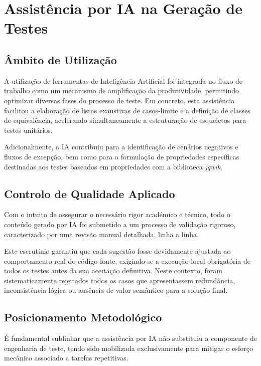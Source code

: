 \documentclass{article}
\begin{document}
\section{Assistência por IA na Geração de Testes}

\subsection{Âmbito de Utilização}

A utilização de ferramentas de Inteligência Artificial foi integrada no fluxo de trabalho como um mecanismo de amplificação da produtividade, permitindo optimizar diversas fases do processo de teste. Em concreto, esta assistência facilitou a elaboração de listas exaustivas de casos-limite e a definição de classes de equivalência, acelerando simultaneamente a estruturação de esqueletos para testes unitários. 

Adicionalmente, a IA contribuiu para a identificação de cenários negativos e fluxos de excepção, bem como para a formulação de propriedades específicas destinadas aos testes baseados em propriedades com a biblioteca \emph{jqwik}.

\subsection{Controlo de Qualidade Aplicado}

Com o intuito de assegurar o necessário rigor académico e técnico, todo o conteúdo gerado por IA foi submetido a um processo de validação rigoroso, caracterizado por uma revisão manual detalhada, linha a linha. 

Este escrutínio garantiu que cada sugestão fosse devidamente ajustada ao comportamento real do código fonte, exigindo-se a execução local obrigatória de todos os testes antes da sua aceitação definitiva. Neste contexto, foram sistematicamente rejeitados todos os casos que apresentassem redundância, inconsistência lógica ou ausência de valor semântico para a solução final.

\subsection{Posicionamento Metodológico}

É fundamental sublinhar que a assistência por IA não substituiu a componente de engenharia de teste, tendo sido mobilizada exclusivamente para mitigar o esforço mecânico associado a tarefas repetitivas.
\end{document}
